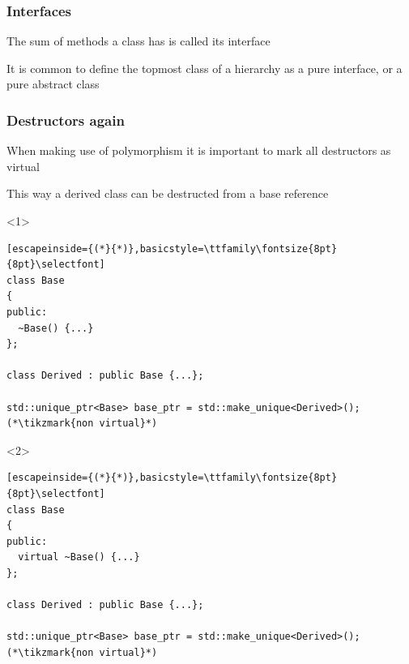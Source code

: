 \documentclass[14pt,a4paper,dvipsnames,usenames]{beamer}
\begin{document}
\begin{frame}[fragile]
  \frametitle{Interfaces}

  The sum of methods a class has is called its interface

  \vspace{1cm}
  It is common to define the topmost class of a hierarchy as a pure interface, or a pure abstract class
  
\end{frame}

\begin{frame}[fragile]
  \frametitle{Destructors again}

  When making use of polymorphism it is important to mark all destructors as virtual
  
  \vspace{.5cm}
  This way a derived class can be destructed from a base reference

  \begin{overlayarea}{\textwidth}{3cm}
  \begin{onlyenv}<1>
  \begin{lstlisting}[escapeinside={(*}{*)},basicstyle=\ttfamily\fontsize{8pt}{8pt}\selectfont]
class Base
{
public:
  ~Base() {...}
};

class Derived : public Base {...};

std::unique_ptr<Base> base_ptr = std::make_unique<Derived>();(*\tikzmark{non virtual}*)
  \end{lstlisting}

  \nointerlineskip
  \end{onlyenv}
  \begin{onlyenv}<2>
  \begin{lstlisting}[escapeinside={(*}{*)},basicstyle=\ttfamily\fontsize{8pt}{8pt}\selectfont]
class Base
{
public:
  virtual ~Base() {...}
};

class Derived : public Base {...};

std::unique_ptr<Base> base_ptr = std::make_unique<Derived>();(*\tikzmark{non virtual}*)
  \end{lstlisting}

  \nointerlineskip
  \end{onlyenv}
  \end{overlayarea}

\end{frame}
\end{document}
